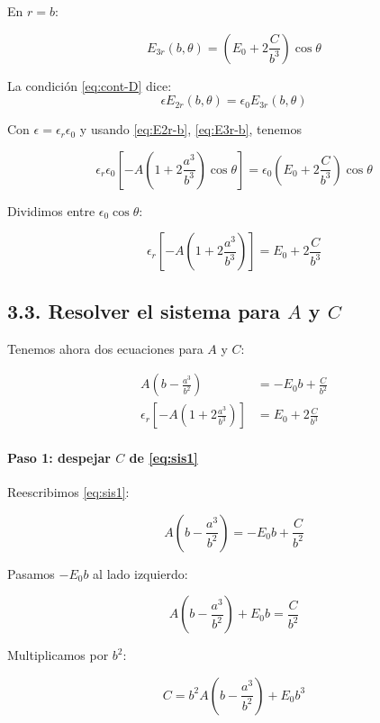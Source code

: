 \documentclass{article}
\begin{document}
En $r=b$:

\begin{equation}
E_{3r}(b,\theta)
= \left(E_{0} + 2\frac{C}{b^{3}}\right)\cos\theta
\label{eq:E3r-b}
\end{equation}

\medskip

La condición \eqref{eq:cont-D} dice:
\[
\epsilon E_{2r}(b,\theta) = \epsilon_{0} E_{3r}(b,\theta)
\]

Con $\epsilon = \epsilon_{r}\epsilon_{0}$ y usando \eqref{eq:E2r-b}, \eqref{eq:E3r-b}, tenemos

\[
\epsilon_{r}\epsilon_{0}\left[-A\left(1 + 2\frac{a^{3}}{b^{3}}\right)\cos\theta\right]
= \epsilon_{0}\left(E_{0} + 2\frac{C}{b^{3}}\right)\cos\theta
\]

Dividimos entre $\epsilon_{0}\cos\theta$:

\begin{equation}
\epsilon_{r}\left[-A\left(1 + 2\frac{a^{3}}{b^{3}}\right)\right]
= E_{0} + 2\frac{C}{b^{3}}
\label{eq:cond-D-b}
\end{equation}

\subsection*{3.3. Resolver el sistema para $A$ y $C$}

Tenemos ahora dos ecuaciones para $A$ y $C$:

\begin{align}
A\left(b - \frac{a^{3}}{b^{2}}\right) &= -E_{0} b + \frac{C}{b^{2}}
\label{eq:sis1}\\[4pt]
\epsilon_{r}\left[-A\left(1 + 2\frac{a^{3}}{b^{3}}\right)\right]
&= E_{0} + 2\frac{C}{b^{3}}
\label{eq:sis2}
\end{align}

\paragraph{Paso 1: despejar $C$ de \eqref{eq:sis1}}

Reescribimos \eqref{eq:sis1}:

\[
A\left(b - \frac{a^{3}}{b^{2}}\right)
= -E_{0} b + \frac{C}{b^{2}}
\]

Pasamos $-E_{0}b$ al lado izquierdo:

\[
A\left(b - \frac{a^{3}}{b^{2}}\right) + E_{0}b
= \frac{C}{b^{2}}
\]

Multiplicamos por $b^{2}$:

\begin{equation}
C = b^{2}A\left(b - \frac{a^{3}}{b^{2}}\right) + E_{0}b^{3}
\label{eq:C-en-terminos-de-A-raw}
\end{equation}
\end{document}
